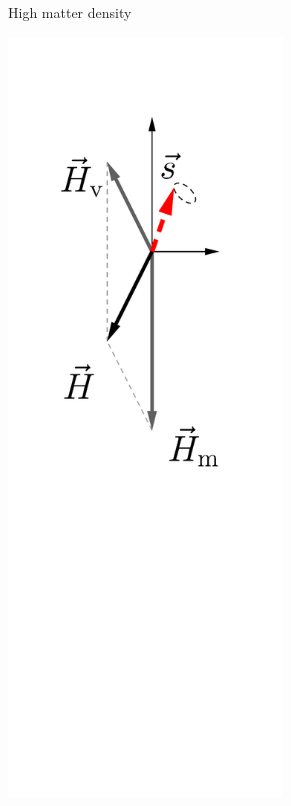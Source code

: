 \begin{figure}[htbp]
\begin{subfigure}[t]{0.3\textwidth}
		\caption{High matter density}\label{chap:basics-sec:flavor-isospin-pic-fig:msw-adiabatic-large-density}
	\end{subfigure}%
	\begin{subfigure}[t]{0.3\textwidth}
		\centering
		\includegraphics[width=0.8\textwidth]{chapters/assets/matter/matter-effect-adiabatic}

\end{subfigure}
\end{figure}

